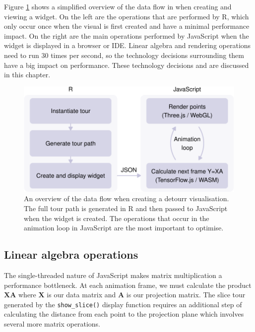 Figure \ref{fig:dataflow} shows a simplified overview of the data flow in  when creating and viewing a widget. On the left are the operations that are performed by R, which only occur once when the visual is first created and have a minimal performance impact. On the right are the main operations performed by JavaScript when the widget is displayed in a browser or IDE. Linear algebra and rendering operations need to run 30 times per second, so the technology decisions surrounding them have a big impact on performance. These technology decisions and are discussed in this chapter.

\begin{figure}
\includegraphics[width=\textwidth]{detourr_files/figure-latex/dataflow-1} \caption{An overview of the data flow when creating a detourr visualisation. The full tour path is generated in R and then passed to JavaScript when the widget is created. The operations that occur in the animation loop in JavaScript are the most important to optimise.}\label{fig:dataflow}
\end{figure}

\hypertarget{linear-algebra-operations}{%
\subsection{Linear algebra operations}\label{linear-algebra-operations}}

The single-threaded nature of JavaScript makes matrix multiplication a performance bottleneck. At each animation frame, we must calculate the product \(\mathbf{XA}\) where \(\mathbf{X}\) is our data matrix and \(\mathbf{A}\) is our projection matrix. The slice tour generated by the \texttt{show\_slice()} display function requires an additional step of calculating the distance from each point to the projection plane which involves several more matrix operations.

